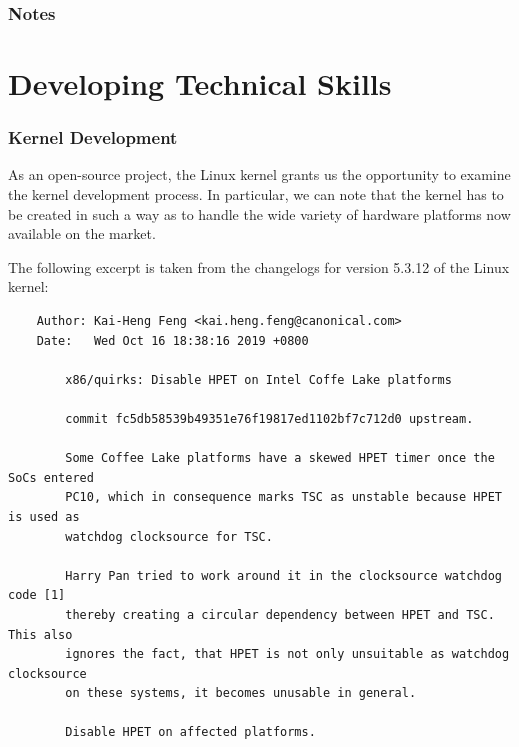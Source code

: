     \subsubsection*{Notes}

    \vfill


    \pagebreak
    \section*{Developing Technical Skills}
    \subsubsection*{Kernel Development}
    As an open-source project, the Linux kernel grants us the opportunity to examine the kernel development process. In particular, we can note that the kernel has to be created in such a way as to handle the wide variety of hardware platforms now available on the market.

    \medskip
    The following excerpt is taken from the changelogs for version 5.3.12 of the Linux kernel:

    {\footnotesize
    \begin{verbatim}
    Author: Kai-Heng Feng <kai.heng.feng@canonical.com>
    Date:   Wed Oct 16 18:38:16 2019 +0800
    
        x86/quirks: Disable HPET on Intel Coffe Lake platforms
        
        commit fc5db58539b49351e76f19817ed1102bf7c712d0 upstream.
        
        Some Coffee Lake platforms have a skewed HPET timer once the SoCs entered
        PC10, which in consequence marks TSC as unstable because HPET is used as
        watchdog clocksource for TSC.
        
        Harry Pan tried to work around it in the clocksource watchdog code [1]
        thereby creating a circular dependency between HPET and TSC. This also
        ignores the fact, that HPET is not only unsuitable as watchdog clocksource
        on these systems, it becomes unusable in general.
        
        Disable HPET on affected platforms.
    \end{verbatim}
    }

